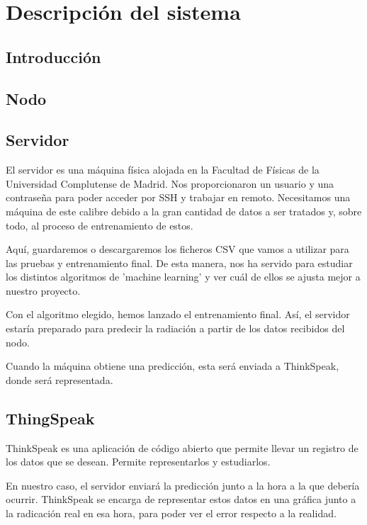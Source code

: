 \cleardoublepage

\chapter{Descripción del sistema}
\label{makereference2}

\section{Introducción}
\label{makereference2.1} 

\section{Nodo}
\label{makereference2.2}


\section{Servidor}
\label{makereference2.3}

El servidor es una máquina física alojada en la Facultad de Físicas de la Universidad Complutense de Madrid. Nos proporcionaron un usuario y una contraseña para poder acceder por SSH y trabajar en remoto. Necesitamos una máquina de este calibre debido a la gran cantidad de datos a ser tratados y, sobre todo, al proceso de entrenamiento de estos.

Aquí, guardaremos o descargaremos los ficheros CSV que vamos a utilizar para las pruebas y entrenamiento final. De esta manera, nos ha servido para estudiar los distintos algoritmos de 'machine learning' y ver cuál de ellos se ajusta mejor a nuestro proyecto.

Con el algoritmo elegido, hemos lanzado el entrenamiento final. Así, el servidor estaría preparado para predecir la radiación a partir de los datos recibidos del nodo.

Cuando la máquina obtiene una predicción, esta será enviada a ThinkSpeak, donde será representada.

\section{ThingSpeak}
\label{makereference2.4}

ThinkSpeak es una aplicación de código abierto que permite llevar un registro de los datos que se desean. Permite representarlos y estudiarlos.

En nuestro caso, el servidor enviará la predicción junto a la hora a la que debería ocurrir. ThinkSpeak se encarga de representar estos datos en una gráfica junto a la radicación real en esa hora, para poder ver el error respecto a la realidad.
